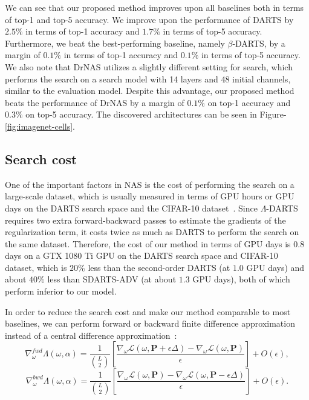 \documentclass{article} \usepackage{fancyhdr, iclr2023_conference, times}
\def\mP{{\bm{P}}}
\newcommand{\mydarts}{$\Lambda$-DARTS\xspace}
\begin{document}
\par We can see that our proposed method improves upon all baselines both in terms of top-1 and top-5 accuracy. We improve upon the performance of DARTS by $2.5\%$ in terms of top-1 accuracy and $1.7\%$ in terms of top-5 accuracy. Furthermore, we beat the best-performing baseline, namely $\beta$-DARTS, by a margin of $0.1\%$ in terms of top-1 accuracy and $0.1\%$ in terms of top-5 accuracy. We also note that DrNAS utilizes a slightly different setting for search, which performs the search on a search model with 14 layers and 48 initial channels, similar to the evaluation model. Despite this advantage, our proposed method beats the performance of DrNAS by a margin of $0.1\%$ on top-1 accuracy and $0.3\%$ on top-5 accuracy. The discovered architectures can be seen in Figure-\ref{fig:imagenet-cells}.
\subsection{Search cost}
\label{sec:appndx-search-cost}
\par One of the important factors in NAS is the cost of performing the search on a large-scale dataset, which is usually measured in terms of GPU hours or GPU days on the DARTS search space and the CIFAR-10 dataset~\citep{DBLP:journals/jmlr/ElskenMH19}. Since \mydarts requires two extra forward-backward passes to estimate the gradients of the regularization term, it costs twice as much as DARTS to perform the search on the same dataset. Therefore, the cost of our method in terms of GPU days is $0.8$ days on a GTX 1080 Ti GPU on the DARTS search space and CIFAR-10 dataset, which is $20\%$ less than the second-order DARTS (at $1.0$ GPU days) and about $40\%$ less than SDARTS-ADV (at about $1.3$ GPU days), both of which perform inferior to our model.
\par In order to reduce the search cost and make our method comparable to most baselines, we can perform forward or backward finite difference approximation instead of a central difference approximation~\citep{DBLP:journals/corr/abs-2009-07098}:
\begin{equation}
    \nabla_\omega^{fwd} \Lambda(\omega, \alpha)=\frac{1}{\binom{L}{2}} \left[\frac{\nabla_\omega \mathcal{L}(\omega, \mP+\epsilon \Delta)-\nabla_\omega \mathcal{L}(\omega, \mP)}{\epsilon}\right]+O(\epsilon),
\end{equation}
\begin{equation}
    \nabla_\omega^{bwd} \Lambda(\omega, \alpha)=\frac{1}{\binom{L}{2}} \left[\frac{\nabla_\omega \mathcal{L}(\omega, \mP)-\nabla_\omega \mathcal{L}(\omega, \mP-\epsilon \Delta)}{\epsilon}\right]+O(\epsilon).
\end{equation}
\end{document}
